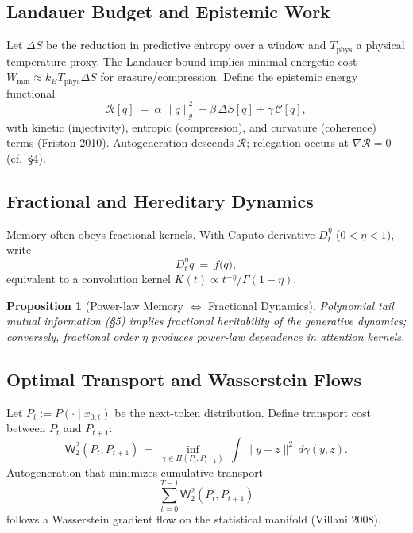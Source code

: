 \documentclass[12pt,a4paper,twoside,openright]{book}
\newtheorem{proposition}[theorem]{Proposition}
\begin{document}
\subsection{Landauer Budget and Epistemic Work}
Let $\Delta S$ be the reduction in predictive entropy over a window and $T_{\mathrm{phys}}$ a physical temperature proxy.
The Landauer bound implies minimal energetic cost $W_{\min}\approx k_B T_{\mathrm{phys}}\Delta S$ for erasure/compression.
Define the epistemic energy functional
\begin{equation}
\mathcal{R}[q]\ =\ \alpha\,\|\dot q\|_g^2 - \beta\,\Delta S[q] + \gamma\,\mathcal{C}[q],
\end{equation}
with kinetic (injectivity), entropic (compression), and curvature (coherence) terms (Friston 2010).
Autogeneration descends $\mathcal{R}$; relegation occurs at $\nabla \mathcal{R}=0$ (cf.\ §4).

\subsection{Fractional and Hereditary Dynamics}
Memory often obeys fractional kernels.
With Caputo derivative $D_t^\eta$ ($0<\eta<1$), write
\begin{equation}
D_t^\eta q\ =\ f\big(q\big),
\end{equation}
equivalent to a convolution kernel $K(t)\propto t^{-\eta}/\Gamma(1-\eta)$.

\begin{proposition}[Power-law Memory $\Leftrightarrow$ Fractional Dynamics]
Polynomial tail mutual information (§5) implies fractional heritability of the generative dynamics; conversely, fractional order $\eta$ produces power-law dependence in attention kernels.
\end{proposition}

\subsection{Optimal Transport and Wasserstein Flows}
Let $P_t:=P(\cdot \mid x_{0:t})$ be the next-token distribution.
Define transport cost between $P_t$ and $P_{t+1}$:
\begin{equation}
\mathsf{W}_2^2(P_t,P_{t+1})\ =\ \inf_{\gamma\in\Pi(P_t,P_{t+1})}\ \int \|y-z\|^2\,d\gamma(y,z).
\end{equation}
Autogeneration that minimizes cumulative transport
\begin{equation}
\sum_{t=0}^{T-1} \mathsf{W}_2^2(P_t,P_{t+1})
\end{equation}
follows a Wasserstein gradient flow on the statistical manifold (Villani 2008).
\end{document}
